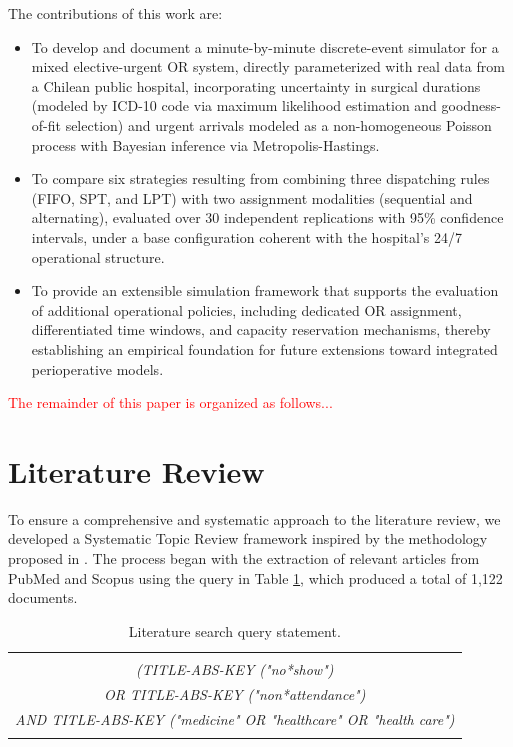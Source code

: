 \documentclass[sn-mathphys-num]{sn-jnl}
\begin{document}
The contributions of this work are:
\begin{itemize}
  \item To develop and document a minute-by-minute discrete-event simulator
  for a mixed elective-urgent OR system, directly parameterized with real data
  from a Chilean public hospital, incorporating uncertainty in surgical
  durations (modeled by ICD-10 code via maximum likelihood estimation and
  goodness-of-fit selection) and urgent arrivals modeled as a non-homogeneous
  Poisson process with Bayesian inference via Metropolis-Hastings.
  \item To compare six strategies resulting from combining three dispatching
  rules (FIFO, SPT, and LPT) with two assignment modalities (sequential and
  alternating), evaluated over 30 independent replications with 95\%
  confidence intervals, under a base configuration coherent with the
  hospital's 24/7 operational structure.
  \item To provide an extensible simulation framework that supports the
  evaluation of additional operational policies, including dedicated OR
  assignment, differentiated time windows, and capacity reservation
  mechanisms, thereby establishing an empirical foundation for future
  extensions toward integrated perioperative models.
\end{itemize}

\textcolor{red}{The remainder of this paper is organized as follows...}



\section{Literature Review}

    To ensure a comprehensive and systematic approach to the literature review, we developed a Systematic Topic Review framework inspired by the methodology proposed in \cite{gana2024leveraging}. The process began with the extraction of relevant articles from PubMed and Scopus using the query in Table \ref{tab:query}, which produced a total of 1,122 documents.

    
    \begin{table}[ht]
        \centering
        \caption{Literature search query statement.}
        \label{tab:query}
        \vspace{5pt} %
        \begin{tabular}{@{}|c|@{}}
            \hline
            \\
            \textit{{\color{purple}(TITLE-ABS-KEY (}\;"no*show"{\color{purple}\;)}} \\
            \textit{{\color{purple}OR TITLE-ABS-KEY (}\;"non*attendance"{\color{purple}\;)}} \\
            \textit{{\color{purple}AND TITLE-ABS-KEY (}\;"medicine" OR "healthcare" OR "health care"{\color{purple}\;)}} \\
            \\
            \hline
        \end{tabular}
    \end{table}
    
\end{document}

